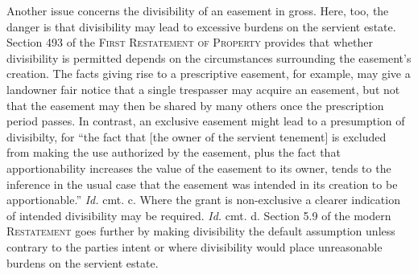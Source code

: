 Another issue concerns the divisibility of an easement in gross. Here, too, the
danger is that divisibility may lead to excessive burdens on the servient
estate. Section 493 of the \textsc{First Restatement of Property} provides that
whether
divisibility is permitted depends on the circumstances surrounding the
easement's creation. The facts giving rise to a prescriptive easement, for
example, may give a landowner fair notice that a single trespasser may acquire
an easement, but not that the easement may then be shared by many others once
the prescription period passes. In contrast, an exclusive easement might lead to
a presumption of divisibilty, for ``the fact that [the owner of the servient
tenement] is excluded from making the use authorized by the easement, plus the
fact that apportionability increases the value of the easement to its owner,
tends to the inference in the usual case that the easement was intended in its
creation to be apportionable.'' \textit{Id.} cmt. c. Where the grant is
non-exclusive a clearer indication of intended divisibility may be required.
\textit{Id.} cmt. d. Section 5.9 of the modern \textsc{Restatement} goes further
by
making divisibility the default assumption unless contrary to the parties intent
or where divisibility would place unreasonable burdens on the servient estate.

